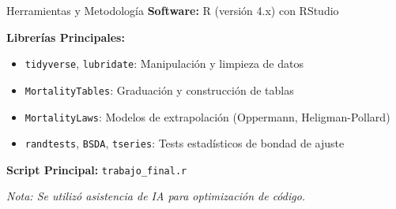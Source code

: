 \begin{frame}{Herramientas y Metodología}
  \textbf{Software:} R (versión 4.x) con RStudio
  
  \vspace{0.5cm}
  
  \textbf{Librerías Principales:}
  \begin{itemize}
    \item \texttt{tidyverse}, \texttt{lubridate}: Manipulación y limpieza de datos
    \item \texttt{MortalityTables}: Graduación y construcción de tablas
    \item \texttt{MortalityLaws}: Modelos de extrapolación (Oppermann, Heligman-Pollard)
    \item \texttt{randtests}, \texttt{BSDA}, \texttt{tseries}: Tests estadísticos de bondad de ajuste
  \end{itemize}
  
  \vspace{0.5cm}
  
  \textbf{Script Principal:} \texttt{trabajo\_final.r}
  
  \vspace{0.3cm}
  
  \small{\textit{Nota: Se utilizó asistencia de IA para optimización de código.}}
\end{frame}
